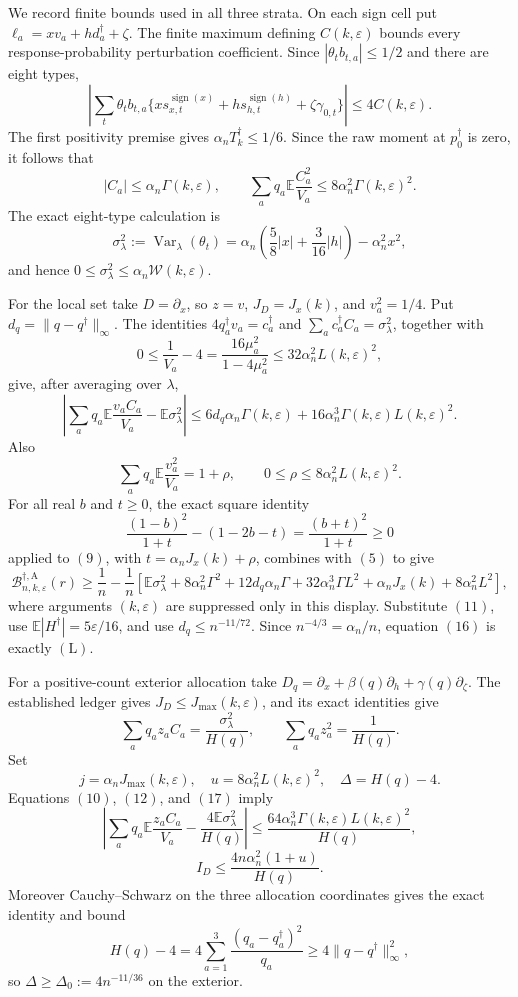 We record finite bounds used in all three strata.  On each sign cell put
\(\ell_a=xv_a+hd_a^\dagger+\zeta\).  The finite maximum defining
\(C(k,\varepsilon)\) bounds every response-probability perturbation coefficient.  Since \(|\theta_tb_{t,a}|\le1/2\) and there are eight types,
\[
\left|\sum_t\theta_tb_{t,a}
\{xs_{x,t}^{\operatorname{sign}(x)}
+hs_{h,t}^{\operatorname{sign}(h)}+\zeta\gamma_{0,t}\}\right|
\le4C(k,\varepsilon).
\]
The first positivity premise gives \(\alpha_nT_k^\dagger\le1/6\).  Since the raw moment at \(p_0^\dagger\) is zero, it follows that
\[
|C_a|\le\alpha_n\Gamma(k,\varepsilon),
\qquad
\sum_aq_a\mathbb E\frac{C_a^2}{V_a}
\le8\alpha_n^2\Gamma(k,\varepsilon)^2.
\tag{10}
\]
The exact eight-type calculation is
\[
\sigma_\lambda^2:=\operatorname{Var}_\lambda(\theta_t)
=\alpha_n\left(\frac58|x|+\frac3{16}|h|\right)-\alpha_n^2x^2,
\tag{11}
\]
and hence
\(0\le\sigma_\lambda^2\le\alpha_n\mathcal W(k,\varepsilon)\).

For the local set take \(D=\partial_x\), so \(z=v\), \(J_D=J_x(k)\), and \(v_a^2=1/4\).  Put \(d_q=\|q-q^\dagger\|_\infty\).  The identities
\(4q_a^\dagger v_a=c_a^\dagger\) and
\(\sum_ac_a^\dagger C_a=\sigma_\lambda^2\), together with
\[
0\le \frac1{V_a}-4
=\frac{16\mu_a^2}{1-4\mu_a^2}
\le32\alpha_n^2L(k,\varepsilon)^2,
\tag{12}
\]
give, after averaging over \(\lambda\),
\[
\left|\sum_aq_a\mathbb E\frac{v_aC_a}{V_a}
-\mathbb E\sigma_\lambda^2\right|
\le6d_q\alpha_n\Gamma(k,\varepsilon)
+16\alpha_n^3\Gamma(k,\varepsilon)L(k,\varepsilon)^2.
\tag{13}
\]
Also
\[
\sum_aq_a\mathbb E\frac{v_a^2}{V_a}=1+\rho,
\qquad 0\le\rho\le8\alpha_n^2L(k,\varepsilon)^2.
\tag{14}
\]
For all real \(b\) and \(t\ge0\), the exact square identity
\[
\frac{(1-b)^2}{1+t}-(1-2b-t)=\frac{(b+t)^2}{1+t}\ge0
\tag{15}
\]
applied to \((9)\), with
\(t=\alpha_nJ_x(k)+\rho\), combines with \((5)\) to give
\[
\mathcal B_{n,k,\varepsilon}^{\dagger,\mathrm A}(r)
\ge\frac1n-\frac1n\left[
\mathbb E\sigma_\lambda^2+8\alpha_n^2\Gamma^2
+12d_q\alpha_n\Gamma+32\alpha_n^3\Gamma L^2
+\alpha_nJ_x(k)+8\alpha_n^2L^2\right],
\tag{16}
\]
where arguments \((k,\varepsilon)\) are suppressed only in this display.  Substitute \((11)\), use
\(\mathbb E|H^\dagger|=5\varepsilon/16\), and use
\(d_q\le n^{-11/72}\).  Since \(n^{-4/3}=\alpha_n/n\), equation \((16)\) is exactly \((\mathrm L)\).

For a positive-count exterior allocation take
\(D_q=\partial_x+\beta(q)\partial_h+\gamma(q)\partial_\zeta\).
The established ledger gives \(J_D\le J_{\max}(k,\varepsilon)\), and its exact identities give
\[
\sum_aq_az_aC_a=\frac{\sigma_\lambda^2}{H(q)},
\qquad
\sum_aq_az_a^2=\frac1{H(q)}.
\tag{17}
\]
Set
\[
j=\alpha_nJ_{\max}(k,\varepsilon),
\quad u=8\alpha_n^2L(k,\varepsilon)^2,
\quad \Delta=H(q)-4.
\]
Equations \((10)\), \((12)\), and \((17)\) imply
\[
\left|\sum_aq_a\mathbb E\frac{z_aC_a}{V_a}
-\frac{4\mathbb E\sigma_\lambda^2}{H(q)}\right|
\le\frac{64\alpha_n^3\Gamma(k,\varepsilon)L(k,\varepsilon)^2}{H(q)},
\tag{18}
\]
\[
I_D\le\frac{4n\alpha_n^2(1+u)}{H(q)}.
\tag{19}
\]
Moreover Cauchy--Schwarz on the three allocation coordinates gives the exact identity and bound
\[
H(q)-4=4\sum_{a=1}^3\frac{(q_a-q_a^\dagger)^2}{q_a}
\ge4\|q-q^\dagger\|_\infty^2,
\tag{20}
\]
so \(\Delta\ge\Delta_0:=4n^{-11/36}\) on the exterior.

